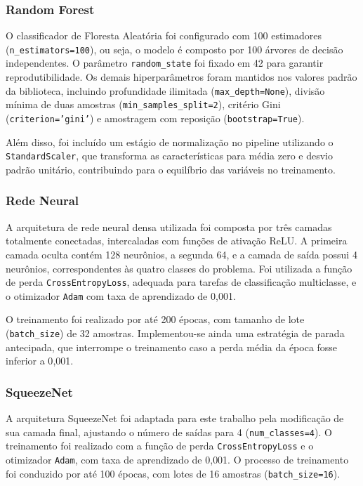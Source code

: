 \subsubsection{Random Forest}

O classificador de Floresta Aleatória foi configurado com 100 estimadores (\texttt{n\_estimators=100}), ou seja, o modelo é composto por 100 árvores de decisão independentes. O parâmetro \texttt{random\_state} foi fixado em 42 para garantir reprodutibilidade. Os demais hiperparâmetros foram mantidos nos valores padrão da biblioteca, incluindo profundidade ilimitada (\texttt{max\_depth=None}), divisão mínima de duas amostras (\texttt{min\_samples\_split=2}), critério Gini (\texttt{criterion='gini'}) e amostragem com reposição (\texttt{bootstrap=True}).

Além disso, foi incluído um estágio de normalização no pipeline utilizando o \texttt{StandardScaler}, que transforma as características para média zero e desvio padrão unitário, contribuindo para o equilíbrio das variáveis no treinamento.

\subsubsection{Rede Neural}

A arquitetura de rede neural densa utilizada foi composta por três camadas totalmente conectadas, intercaladas com funções de ativação ReLU. A primeira camada oculta contém 128 neurônios, a segunda 64, e a camada de saída possui 4 neurônios, correspondentes às quatro classes do problema. Foi utilizada a função de perda \texttt{CrossEntropyLoss}, adequada para tarefas de classificação multiclasse, e o otimizador \texttt{Adam} com taxa de aprendizado de 0{,}001.

O treinamento foi realizado por até 200 épocas, com tamanho de lote (\texttt{batch\_size}) de 32 amostras. Implementou-se ainda uma estratégia de parada antecipada, que interrompe o treinamento caso a perda média da época fosse inferior a 0{,}001.

\subsubsection{SqueezeNet}

A arquitetura SqueezeNet foi adaptada para este trabalho pela modificação de sua camada final, ajustando o número de saídas para 4 (\texttt{num\_classes=4}). O treinamento foi realizado com a função de perda \texttt{CrossEntropyLoss} e o otimizador \texttt{Adam}, com taxa de aprendizado de 0{,}001. O processo de treinamento foi conduzido por até 100 épocas, com lotes de 16 amostras (\texttt{batch\_size=16}).

